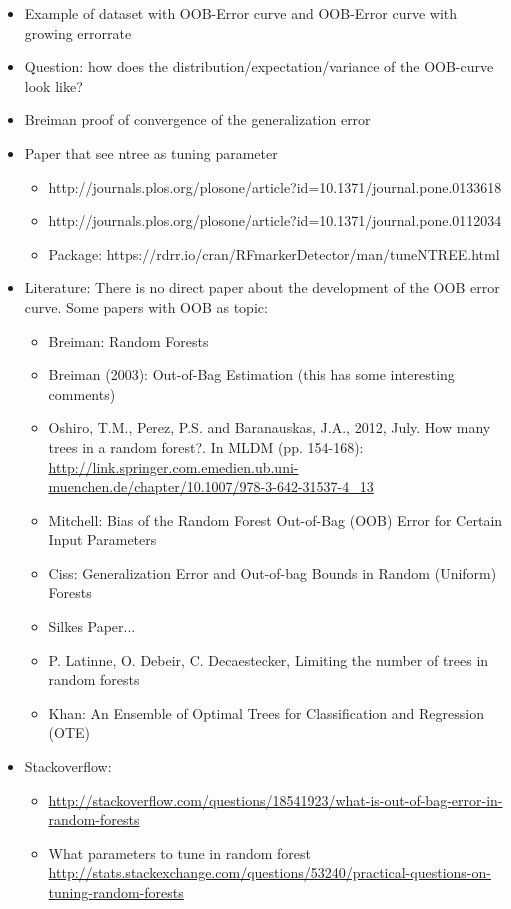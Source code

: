 \documentclass[paper=a4
               ,12pt
               ,DIV=12
               ,parskip=half
               ,titlepage=on
               ,headinclude 
               ,footinclude
               ,headsepline
               ,footsepline         %
               ,ilines 
               ]{scrartcl}
\begin{document}
\begin{itemize}
\item Example of dataset with OOB-Error curve and OOB-Error curve with growing errorrate
\item Question: how does the distribution/expectation/variance of the OOB-curve look like?
\item Breiman proof of convergence of the generalization error
\item Paper that see ntree as tuning parameter
\begin{itemize}
\item http://journals.plos.org/plosone/article?id=10.1371/journal.pone.0133618
\item http://journals.plos.org/plosone/article?id=10.1371/journal.pone.0112034
\item Package: https://rdrr.io/cran/RFmarkerDetector/man/tuneNTREE.html
\end{itemize}
\item Literature: There is no direct paper about the development of the OOB error curve. Some papers with OOB as topic:
\begin{itemize}
\item Breiman: Random Forests
\item Breiman (2003): Out-of-Bag Estimation (this has some interesting comments)
\item Oshiro, T.M., Perez, P.S. and Baranauskas, J.A., 2012, July. How many trees in a random forest?. In MLDM (pp. 154-168): \url{http://link.springer.com.emedien.ub.uni-muenchen.de/chapter/10.1007/978-3-642-31537-4_13}
\item Mitchell: Bias of the Random Forest Out-of-Bag (OOB) Error for Certain Input Parameters
\item Ciss: Generalization Error and Out-of-bag Bounds in Random (Uniform) Forests
\item Silkes Paper...
\item  P. Latinne, O. Debeir, C. Decaestecker, Limiting the number of
trees in random forests
\item Khan: An Ensemble of Optimal Trees for Classification and Regression (OTE)
\end{itemize}
\item Stackoverflow: 
\begin{itemize}
\item \url{http://stackoverflow.com/questions/18541923/what-is-out-of-bag-error-in-random-forests}
\item What parameters to tune in random forest \url{http://stats.stackexchange.com/questions/53240/practical-questions-on-tuning-random-forests}

\end{itemize}
\end{itemize}
\end{document}
